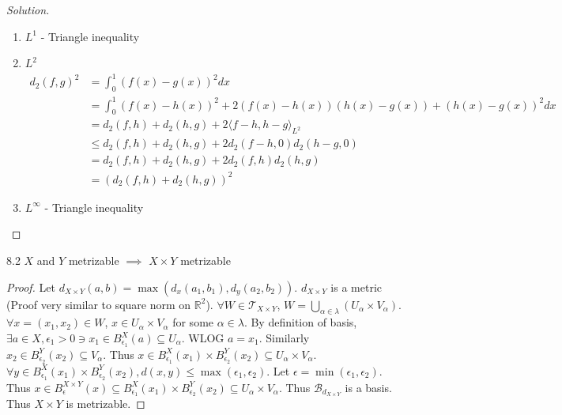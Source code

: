 \documentclass{article}
\newcommand*{\T}{\mathcal{T}}
\newcommand*{\B}{\mathcal{B}}
\newcommand*{\subeq}{\subseteq}
\newcommand{\R}{\mathbb{R}}
\newcommand{\angles}[1]{\langle #1 \rangle}
\newenvironment{solution}
{\renewcommand\qedsymbol{$\blacksquare$}\begin{proof}[Solution]}
{\end{proof}}
\begin{document}
\begin{solution}
\begin{enumerate}
\begin{enumerate}
\begin{align*}
                d(x, y) &= 1 - \delta(x, y) \leq 1 - \delta(x, z) + 1 - \delta(z, y) = d(x, z) + d(z, y)
            \end{align*}
        \end{enumerate}
        \item $L^1$ - Triangle inequality
        \item $L^2$
        \begin{align*}
            d_{2}(f, g)^2 &= \int_{0}^{1} (f(x) - g(x))^2 dx \\
                &= \int_{0}^{1} (f(x) - h(x))^2 + 2(f(x) - h(x))(h(x)- g(x) ) + (h(x) - g(x))^2 dx \\
                &= d_2(f, h) + d_2(h, g) + 2\angles{f - h, h - g}_{L^2} \\
                &\leq d_2(f, h) + d_2(h, g) + 2d_2(f - h, 0)d_2(h - g, 0) \\
                &= d_2(f, h) + d_2(h, g) + 2d_2(f, h)d_2(h, g)\\
                &= (d_2(f, h) + d_2(h, g))^2
        \end{align*}
        \item $L^{\infty}$ - Triangle inequality      
    \end{enumerate}
    
\end{solution}

\bigskip

\begin{claim}{8.2}\label{Claim 8.2.}
    $X$ and $Y$ metrizable $\implies$ $X \times Y$ metrizable     
\end{claim}
\begin{proof}
    Let $d_{X \times Y}(a, b) = \max\left(d_x(a_1, b_1), d_y(a_2, b_2)\right)$. $d_{X \times Y}$ is a metric (Proof very similar to square norm on $\R^2$). $\forall W \in \T_{X \times Y}$, $W = \bigcup_{\alpha \in \lambda}(U_\alpha \times V_\alpha)$. $\forall x = (x_1, x_2) \in W$, $x \in U_\alpha \times V_\alpha$ for some $\alpha \in \lambda$. By definition of basis, $\exists a \in X, \epsilon_1 > 0 \ni x_1 \in B^X_{\epsilon_1}(a) \subeq U_\alpha$. WLOG $a = x_1$. Similarly $x_2 \in B^Y_{\epsilon_2}(x_2) \subeq V_{\alpha}$. Thus $x \in B^X_{\epsilon_{1}}(x_1) \times B^Y_{\epsilon_{2}}(x_2) \subeq U_\alpha \times V_\alpha$. $\forall y \in B^X_{\epsilon_{1}}(x_1) \times B^Y_{\epsilon_{2}}(x_2), d(x, y) \leq \max\left(\epsilon_1, \epsilon_2\right)$. Let $\epsilon = \min(\epsilon_1, \epsilon_2)$. Thus $x \in B_{\epsilon}^{X \times Y}(x) \subeq B^X_{\epsilon_{1}}(x_1) \times B^Y_{\epsilon_{2}}(x_2) \subeq U_\alpha \times V_\alpha$. Thus $\B_{d_{X \times Y}}$ is a basis. Thus $X \times Y$ is metrizable.           
\end{proof}
\end{document}
